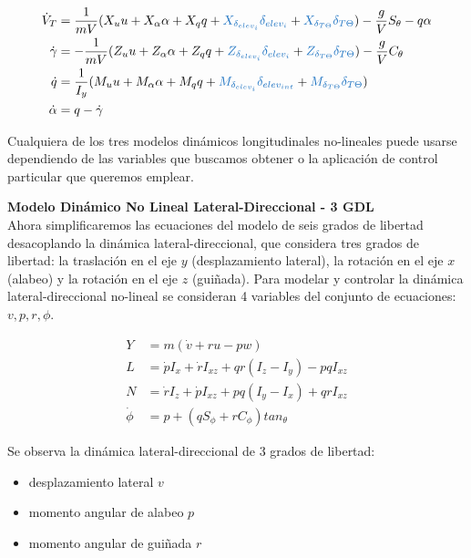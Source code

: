 \begin{align} 
\label{eq: modelo longitudinal gamma}
\dot V_T &= \frac{1}{mV}(X_u u + X_\alpha \alpha + X_q q + \textcolor{RoyalBlue}{X_{\delta_{elev_{i}}} \delta_{elev_{i}}}  + \textcolor{RoyalBlue}{X_{\delta_{T \Theta}} \delta_{T \Theta}}) - \frac{g}{V} S_{\theta} - q \alpha \\
\dot \gamma &= -\frac{1}{mV}(Z_u u + Z_\alpha \alpha + Z_q q + \textcolor{RoyalBlue}{Z_{\delta_{elev_{i}}} \delta_{elev_{i}}} + \textcolor{RoyalBlue}{Z_{\delta_{T \Theta}} \delta_{T \Theta}}) - \frac{g}{V} C_{\theta} \\
\dot q &= \frac{1}{I_{y}}(M_u u + M_\alpha \alpha + M_q q + \textcolor{RoyalBlue}{M_{\delta_{elev_{i}}} \delta_{elev_{int}}}  + \textcolor{RoyalBlue}{M_{\delta_{T \Theta}} \delta_{T \Theta}}) \\
\dot \alpha &= q - \dot \gamma 
\end{align}


Cualquiera de los tres modelos dinámicos longitudinales no-lineales puede usarse dependiendo de las variables que buscamos obtener o la aplicación de control particular que queremos emplear. 

\bigskip
\textbf{Modelo Dinámico No Lineal Lateral-Direccional - 3 GDL}\\
Ahora simplificaremos las ecuaciones del modelo de seis grados de libertad desacoplando la dinámica lateral-direccional, que considera tres grados de libertad: la traslación en el eje $y$ (desplazamiento lateral), la rotación en el eje $x$ (alabeo) y la rotación en el eje $z$ (guiñada). 
Para modelar y controlar la dinámica lateral-direccional no-lineal se consideran 4 variables del conjunto de ecuaciones: $v, p, r, \phi$. 


\begin{align} 
Y &= m (\dot v + ru - pw) \\
L &= \dot p I_x + \dot r I_{xz} + qr(I_z - I_y) - pq I_{xz} \\
N &=  \dot r I_z + \dot p I_{xz} + pq(I_y - I_x) + qr I_{xz}  \\
\dot \phi &= p + (q S_{\phi} + r C_{\phi}) tan_{\theta}
\end{align}

Se observa la dinámica lateral-direccional de 3 grados de libertad: 
\begin{itemize}
    \item desplazamiento lateral $v$
    \item momento angular de alabeo $p$
    \item momento angular de guiñada $r$
\end{itemize}

